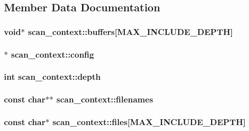 \subsection{Member Data Documentation}
\hypertarget{structscan__context_a49a22b83cacfde03f8f3ac70784ef202}{
\subsubsection[{buffers}]{\setlength{\rightskip}{0pt plus 5cm}void$\ast$ {\bf scan\_\-context::buffers}\mbox{[}MAX\_\-INCLUDE\_\-DEPTH\mbox{]}}}
\label{structscan__context_a49a22b83cacfde03f8f3ac70784ef202}
\hypertarget{structscan__context_a535f3ae7e1140baf91f736e833192147}{
\subsubsection[{config}]{$\ast$ {\bf scan\_\-context::config}}}
\label{structscan__context_a535f3ae7e1140baf91f736e833192147}
\hypertarget{structscan__context_aad7af2747860597a923bdd8cca07bd83}{
\subsubsection[{depth}]{\setlength{\rightskip}{0pt plus 5cm}int {\bf scan\_\-context::depth}}}
\label{structscan__context_aad7af2747860597a923bdd8cca07bd83}
\hypertarget{structscan__context_a772a7e1bd1d4c20a03393667835557c8}{
\subsubsection[{filenames}]{\setlength{\rightskip}{0pt plus 5cm}const char$\ast$$\ast$ {\bf scan\_\-context::filenames}}}
\label{structscan__context_a772a7e1bd1d4c20a03393667835557c8}
\hypertarget{structscan__context_a2b37e18ccf435f4a0d302dd3e01c9b12}{
\subsubsection[{files}]{\setlength{\rightskip}{0pt plus 5cm}const char$\ast$ {\bf scan\_\-context::files}\mbox{[}MAX\_\-INCLUDE\_\-DEPTH\mbox{]}}}
